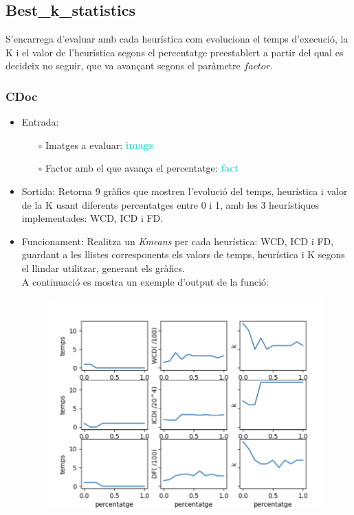 \documentclass[a4paper, 11pt]{article}
\begin{document}
\newpage


\subsection{Best\_k\_statistics}\label{bestkstatistics}
S'encarrega d'evaluar amb cada heurística com evoluciona el temps d'execució, la K i el valor de l'heurística segons el percentatge preestablert a partir del qual es decideix no seguir, que va avançant segons el paràmetre $factor$.
\subsubsection{CDoc}
\begin{itemize}
    \item Entrada: 
    \begin{itemize}
        \item[$\circ$] Imatges a evaluar: \textbf{\textcolor{Turquoise}{imags}}
        \item[$\circ$] Factor amb el que avança el percentatge: \textbf{\textcolor{Turquoise}{fact}}
    \end{itemize}
    \item Sortida: Retorna 9 gràfics que mostren l'evolució del temps, heurística i valor de la K usant diferents percentatges entre 0 i 1, amb les 3 heurístiques implementades: WCD, ICD i FD.
    \item Funcionament: 
    Realitza un \textit{Kmeans} per cada heurística: WCD, ICD i FD, guardant a les llistes corresponents els valors de temps, heurística i K segons el llindar utilitzar, generant els gràfics.\\
    A continuació es mostra un exemple d'output de la funció:
    \begin{figure}[h!]
    \centering
    \includegraphics[scale=0.6]{best_k_statistics_percentatges.PNG}
    \end{figure}
\end{itemize}
\newpage
\end{document}
